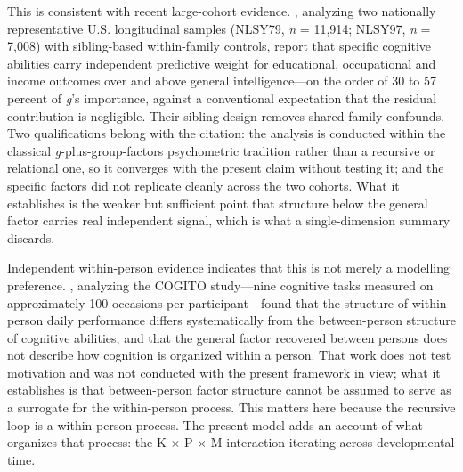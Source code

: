 \documentclass[12pt,a4paper]{article}
\begin{document}
This is consistent with recent large-cohort evidence. , analyzing two nationally representative U.S. longitudinal samples (NLSY79, \emph{n} = 11,914; NLSY97, \emph{n} = 7,008) with sibling-based within-family controls, report that specific cognitive abilities carry independent predictive weight for educational, occupational and income outcomes over and above general intelligence---\hspace{0pt}on the order of 30 to 57 percent of \emph{g}'s importance, against a conventional expectation that the residual contribution is negligible. Their sibling design removes shared family confounds. Two qualifications belong with the citation: the analysis is conducted within the classical \emph{g}-plus-group-factors psychometric tradition rather than a recursive or relational one, so it converges with the present claim without testing it; and the specific factors did not replicate cleanly across the two cohorts. What it establishes is the weaker but sufficient point that structure below the general factor carries real independent signal, which is what a single-dimension summary discards.

Independent within-person evidence indicates that this is not merely a modelling preference. \citet{Schmiedek2020}, analyzing the COGITO study---\hspace{0pt}nine cognitive tasks measured on approximately 100 occasions per participant---\hspace{0pt}found that the structure of within-person daily performance differs systematically from the between-person structure of cognitive abilities, and that the general factor recovered between persons does not describe how cognition is organized within a person. That work does not test motivation and was not conducted with the present framework in view; what it establishes is that between-person factor structure cannot be assumed to serve as a surrogate for the within-person process. This matters here because the recursive loop is a within-person process. The present model adds an account of what organizes that process: the K $\times$ P $\times$ M interaction iterating across developmental time.
\end{document}

